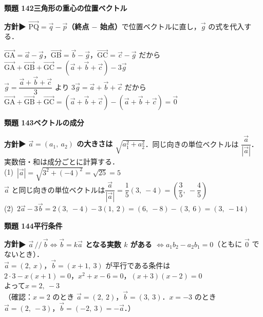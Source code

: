 \documentclass[a4paper,11pt]{ltjsarticle}
\newcommand{\ans}[2]{\Needspace{5\baselineskip}\vspace{6pt}%
  {\sffamily\bfseries 類題 #1\quad #2}\par}
\newcommand{\point}[1]{\textsf{\bfseries ▶ #1}}
\begin{document}
\ans{142}{三角形の重心の位置ベクトル}
\begin{kai}
\textbf{方針}\quad \point{$\overrightarrow{\mathrm{PQ}}=\vec q-\vec p$（終点 $-$ 始点）}で位置ベクトルに直し，$\vec g$ の式を代入する．\\[2pt]
\begin{center}
\end{center}
$\overrightarrow{\mathrm{GA}}=\vec a-\vec g$，\quad $\overrightarrow{\mathrm{GB}}=\vec b-\vec g$，\quad $\overrightarrow{\mathrm{GC}}=\vec c-\vec g$ だから\\
\hspace*{1.5em}$\overrightarrow{\mathrm{GA}}+\overrightarrow{\mathrm{GB}}+\overrightarrow{\mathrm{GC}}=(\vec a+\vec b+\vec c)-3\vec g$\\
$\vec g=\dfrac{\vec a+\vec b+\vec c}3$ より $3\vec g=\vec a+\vec b+\vec c$ だから\\
\hspace*{1.5em}$\overrightarrow{\mathrm{GA}}+\overrightarrow{\mathrm{GB}}+\overrightarrow{\mathrm{GC}}=(\vec a+\vec b+\vec c)-(\vec a+\vec b+\vec c)=\vec0$
\end{kai}

\ans{143}{ベクトルの成分}
\begin{kai}
\textbf{方針}\quad \point{$\vec a=(a_1,\ a_2)$ の大きさは $\sqrt{a_1^2+a_2^2}$}．同じ向きの単位ベクトルは $\dfrac{\vec a}{|\vec a|}$．実数倍・和は成分ごとに計算する．\\[2pt]
(1)\ $|\vec a|=\sqrt{3^2+(-4)^2}=\sqrt{25}=5$\\
\hspace*{1.5em}$\vec a$ と同じ向きの単位ベクトルは\quad $\dfrac{\vec a}{|\vec a|}=\dfrac15(3,\ -4)=\left(\dfrac35,\ -\dfrac45\right)$\\[2pt]
(2)\ $2\vec a-3\vec b=2(3,\ -4)-3(1,\ 2)=(6,\ -8)-(3,\ 6)=(3,\ -14)$
\end{kai}

\ans{144}{平行条件}
\begin{kai}
\textbf{方針}\quad \point{$\vec a\,/\!/\,\vec b\iff\vec b=k\vec a$ となる実数 $k$ がある $\iff a_1b_2-a_2b_1=0$}（ともに $\vec0$ でないとき）．\\[2pt]
$\vec a=(2,\ x)$，$\vec b=(x+1,\ 3)$ が平行である条件は\\
\hspace*{1.5em}$2\cdot3-x(x+1)=0$，\quad $x^2+x-6=0$，\quad $(x+3)(x-2)=0$\\
よって\quad $x=2,\ -3$\\[2pt]
（確認：$x=2$ のとき $\vec a=(2,\ 2)$，$\vec b=(3,\ 3)$．$x=-3$ のとき $\vec a=(2,\ -3)$，$\vec b=(-2,\ 3)=-\vec a$．）
\end{kai}
\end{document}
